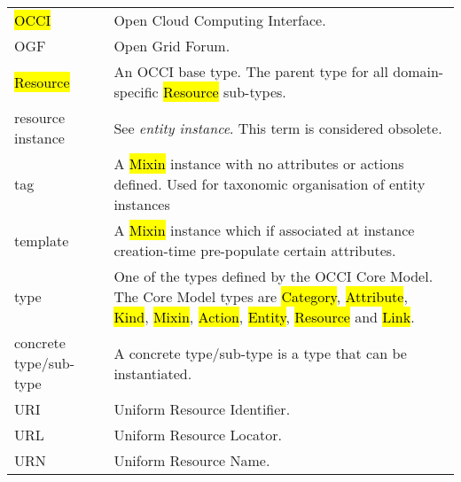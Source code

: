 \begin{tabular}{l|p{12cm}}
\hl{OCCI} & Open Cloud Computing Interface. \\

OGF & Open Grid Forum. \\

\hl{Resource} & An OCCI base type. The parent type for all domain-specific \hl{Resource} sub-types. \\

resource instance & See {\em entity instance}. This term is considered obsolete. \\

tag & A \hl{Mixin} instance with no attributes or actions defined. Used for taxonomic organisation of entity instances\\

template & A \hl{Mixin} instance which if associated at instance
creation-time pre-populate certain attributes. \\

type & One of the types defined by the OCCI Core Model.  The Core Model types are
 \hl{Category}, \hl{Attribute},
 \hl{Kind}, \hl{Mixin}, \hl{Action}, \hl{Entity}, \hl{Resource}
 and \hl{Link}. \\

concrete type/sub-type & A concrete type/sub-type is a type that can be instantiated.\\

URI & Uniform Resource Identifier. \\
URL & Uniform Resource Locator. \\
URN & Uniform Resource Name. \\
\end{tabular}
